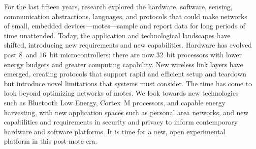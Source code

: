 
For the last fifteen years, research explored the hardware, software, sensing,
communication abstractions, languages, and protocols that could make networks
of small, embedded devices---motes---sample and report data for long periods
of time unattended.
%
Today, the
application and technological landscapes have shifted, introducing new
requirements and new capabilities. Hardware has evolved past 8~and 16~bit
microcontrollers: there are now 32~bit processors with lower energy budgets
and greater computing capability. New wireless link layers have
emerged, creating protocols that support rapid and efficient setup and
teardown but introduce novel limitations that systems must consider.
%
%
The time has come to look beyond optimizing networks of motes. We look towards
new technologies such as Bluetooth Low Energy, Cortex~M processors, and
capable energy harvesting, with new application spaces such as personal area
networks, and new capabilities and requirements in security and privacy to
inform 
contemporary
%
hardware and software platforms.  It is time for a new, open
experimental platform in this post-mote era.%

\marginparwidth=35pt
\marginpar{\color{red}{If we're proposing a platform, we should do it here!}}
